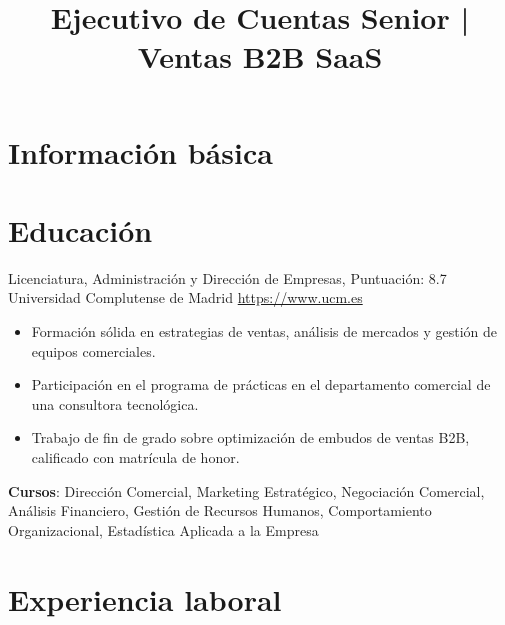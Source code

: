 \documentclass[a4paper, serif, 10pt]{moderncv}
\title{Ejecutivo de Cuentas Senior | Ventas B2B SaaS}
\begin{document}
\maketitle

\section{Información básica}

\section{Educación}

        {Licenciatura, Administración y Dirección de Empresas, Puntuación: 8.7}
        {Universidad Complutense de Madrid}
        {\url{https://www.ucm.es}}
        {}
        {\begin{itemize}
\item Formación sólida en estrategias de ventas, análisis de mercados y gestión de equipos comerciales.
\item Participación en el programa de prácticas en el departamento comercial de una consultora tecnológica.
\item Trabajo de fin de grado sobre optimización de embudos de ventas B2B, calificado con matrícula de honor.
\end{itemize}
\textbf{Cursos}: Dirección Comercial, Marketing Estratégico, Negociación Comercial, Análisis Financiero, Gestión de Recursos Humanos, Comportamiento Organizacional, Estadística Aplicada a la Empresa}
\section{Experiencia laboral}
\end{document}
